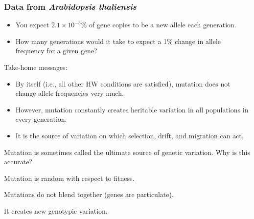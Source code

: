 \begin{frame}[t]
    \frametitle{Data from \textit{Arabidopsis thaliensis}}
    \begin{adjustwidth}{-1.5em}{-1.5em}
    \begin{itemize}
        \item You expect $2.1 \times 10^{-3} \%$ of gene copies to be a new
            allele each generation.

        \item How many generations would it take to expect a 1\% change in
            allele frequency for a given gene?
            
    \end{itemize}
    \end{adjustwidth}
\end{frame}

\begin{frame}
    Take-home messages:

    \begin{itemize}[<+->]
        \item By itself (i.e., all other HW conditions are satisfied), mutation
            does not change allele frequencies very much.

        \item However, mutation constantly creates heritable variation in all
            populations in every generation.
    
        \item It is the source of variation on which selection, drift, and
            migration can act.
    \end{itemize}

\end{frame}

\begin{frame}
    \begin{clickerquestion}
        \item Mutation is sometimes called the ultimate source of genetic
            variation. Why is this accurate?
        \begin{clickeroptions}
            \item Mutation is random with respect to fitness.
            \item {}
            \item Mutations do not blend together (genes are particulate).
            \item It creates new genotypic variation.
        \end{clickeroptions}
    \end{clickerquestion}
\end{frame}

